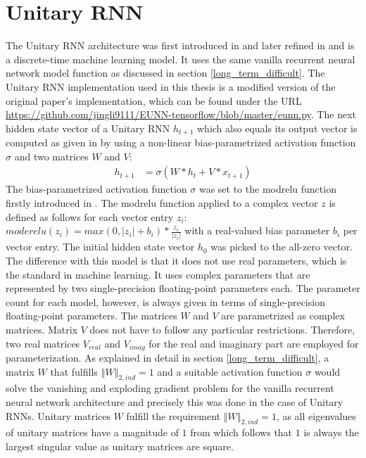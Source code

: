 \documentclass[draft,final]{vutinfth} %
\begin{document}
\section{Unitary RNN} \label{urnn}
The Unitary RNN architecture was first introduced in \cite{UnitaryRNNs} and later refined in \cite{EfficientUnitaryRNNs} and is a discrete-time machine learning model.
It uses the same vanilla recurrent neural network model function as discussed in section \ref{long_term_difficult}.
The Unitary RNN implementation used in this thesis is a modified version of the original paper's implementation, which can be found under the URL \url{https://github.com/jingli9111/EUNN-tensorflow/blob/master/eunn.py}.
The next hidden state vector of a Unitary RNN $h_{t+1}$ which also equals its output vector is computed as given in \cite[p. 2]{EfficientUnitaryRNNs} by using a non-linear bias-parametrized activation function $\sigma$ and two matrices $W$ and $V$:
\begin{align}
\label{urnn_state}
h_{t+1} &= \sigma(W*h_t + V*x_{t+1})
\end{align}
The bias-parametrized activation function $\sigma$ was set to the modrelu function firstly introduced in \cite[p. 4]{UnitaryRNNs}.
The modrelu function applied to a complex vector $z$ is defined as follows for each vector entry $z_i$: $moderelu(z_i) = max(0, |z_i|+b_i) * \frac{z_i}{|z_i|}$ with a real-valued bias parameter $b_i$ per vector entry.
The initial hidden state vector $h_0$ was picked to the all-zero vector.
The difference with this model is that it does not use real parameters, which is the standard in machine learning.
It uses complex parameters that are represented by two single-precision floating-point parameters each.
The parameter count for each model, however, is always given in terms of single-precision floating-point parameters.
The matrices $W$ and $V$ are parametrized as complex matrices.
Matrix $V$ does not have to follow any particular restrictions. Therefore, two real matrices $V_{real}$ and $V_{imag}$ for the real and imaginary part are employed for parameterization.
As explained in detail in section \ref{long_term_difficult}, a matrix $W$ that fulfills $\left\Vert W \right\Vert_{2,ind} = 1$ and a suitable activation function $\sigma$ would solve the vanishing and exploding gradient problem for the vanilla recurrent neural network architecture and precisely this was done in the case of Unitary RNNs.
Unitary matrices $W$ fulfill the requirement $\left\Vert W \right\Vert_{2,ind} = 1$, as all eigenvalues of unitary matrices have a magnitude of $1$ from which follows that $1$ is always the largest singular value as unitary matrices are square.
\end{document}
